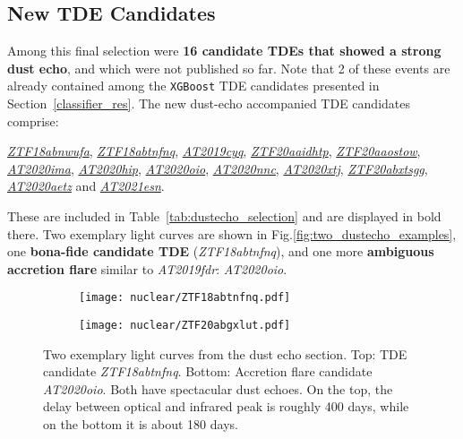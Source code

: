 \subsection{New TDE Candidates}
Among this final selection were \textbf{16 candidate TDEs that showed a strong dust echo}, and which were not published so far. Note that 2 of these events are already contained among the \texttt{XGBoost} TDE candidates presented in Section~\ref{classifier_res}. The new dust-echo accompanied TDE candidates comprise:

\textit{\href{https://ztfnuclear.simeonreusch.com/transient/ZTF18abnwufa}{ZTF18abnwufa}}, \textit{\href{https://ztfnuclear.simeonreusch.com/transient/ZTF18abtnfnq}{ZTF18abtnfnq}}, \textit{\href{https://ztfnuclear.simeonreusch.com/transient/ZTF19aamsgro}{AT2019cyq}}, \textit{\href{https://ztfnuclear.simeonreusch.com/transient/ZTF20aaidhtp}{ZTF20aaidhtp}}, \textit{\href{https://ztfnuclear.simeonreusch.com/transient/ZTF20aaostow}{ZTF20aaostow}}, \textit{\href{https://ztfnuclear.simeonreusch.com/transient/ZTF20aaoxtxi}{AT2020ima}}, \textit{\href{https://ztfnuclear.simeonreusch.com/transient/ZTF20aauvhab}{AT2020hip}}, \textit{\href{https://ztfnuclear.simeonreusch.com/transient/ZTF20abgxlut}{AT2020oio}}, \textit{\href{https://ztfnuclear.simeonreusch.com/transient/ZTF20abhrmri}{AT2020nnc}}, \textit{\href{https://ztfnuclear.simeonreusch.com/transient/ZTF20ablvwmh}{AT2020xtj}}, \textit{\href{https://ztfnuclear.simeonreusch.com/transient/ZTF20abxtsgg}{ZTF20abxtsgg}}, \textit{\href{https://ztfnuclear.simeonreusch.com/transient/ZTF20acyxxfo}{AT2020aetz}} and \textit{\href{https://ztfnuclear.simeonreusch.com/transient/ZTF21aaekxxf}{AT2021esn}}.

These are included in Table~\ref{tab:dustecho_selection} and are displayed in bold there. Two exemplary light curves are shown in Fig.\ref{fig:two_dustecho_examples}, one \textbf{bona-fide candidate TDE} (\textit{ZTF18abtnfnq}), and one more \textbf{ambiguous accretion flare} similar to \textit{AT2019fdr}: \textit{AT2020oio}.

\begin{figure}[htbp]
  \centering
  \begin{subfigure}[b]{1\textwidth}
    \centering
    \texttt{[image: nuclear/ZTF18abtnfnq.pdf]}
  \end{subfigure}
  \begin{subfigure}[b]{1\textwidth}
    \centering
    \texttt{[image: nuclear/ZTF20abgxlut.pdf]}
  \end{subfigure}
  \caption[Two exemplary light curves from the dust echo selection]{Two exemplary light curves from the dust echo section. Top: TDE candidate \textit{ZTF18abtnfnq}. Bottom: Accretion flare candidate \textit{AT2020oio}. Both have spectacular dust echoes. On the top, the delay between optical and infrared peak is roughly 400 days, while on the bottom it is about 180 days.}
\end{figure}

